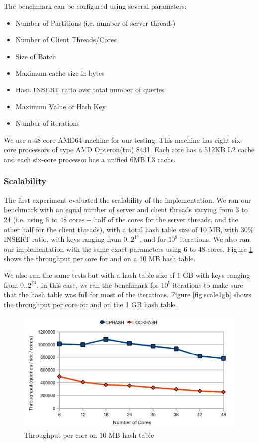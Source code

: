 The benchmark can be configured using several parameters:
\begin{itemize}
\item Number of Partitions (i.e. number of server threads)
\item Number of Client Threads/Cores
\item Size of Batch
\item Maximum cache size in bytes
\item Hash INSERT ratio over total number of queries
\item Maximum Value of Hash Key
\item Number of iterations
\end{itemize}

We use a 48 core AMD64 machine for our testing. This machine has eight six-core processors of type AMD Opteron(tm) 8431. Each core has
a 512KB L2 cache and each six-core processor has a unified 6MB L3 cache.

\subsubsection{Scalability}

The first experiment evaluated the scalability of the \cphash{} implementation. We ran our benchmark with an equal number of server 
and client threads varying from 3 to 24 (i.e. using 6 to 48 cores $-$ half of the cores for the server threads, and the other half for the 
client threads), with a total hash table size of 10 MB, with 30\% INSERT ratio, with keys ranging from 0..$2^{17}$, and for $10^{8}$ iterations. 
We also ran our \lockhash{} implementation with the same exact parameters using 6 to 48 cores. Figure \ref{fig:scale10mb} shows the 
throughput per core for \cphash{} and \lockhash{} on a 10 MB hash table.

We also ran the same tests but with a hash table size of 1 GB with keys ranging from 0..$2^{24}$. In this case, we ran the benchmark for $10^{9}$ iterations to make
sure that the hash table was full for most of the iterations. Figure \ref{fig:scale1gb} shows the throughput per core for \cphash{} and \lockhash{} on the
1 GB hash table.

\begin{figure}[!ht]
  \centering
  \includegraphics[width=0.8\linewidth]{figs/scale10mb.png}
  \caption{Throughput per core on 10 MB hash table}
  \label{fig:scale10mb}
\end{figure}
    
